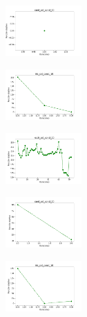 \begin{figure}[H]
\begin{subfigure}
    \end{subfigure}
    \hfill
    \begin{subfigure}
        \centering
        \includegraphics[width=0.32\textwidth]{img/copkm/rand_set_const_10_589741062_cost.png}
    \end{subfigure}
    \hfill
    \begin{subfigure}
        \centering
        \includegraphics[width=0.32\textwidth]{img/copkm/iris_set_const_10_277451237_cost.png}
    \end{subfigure}
    \hfill
    \begin{subfigure}
        \centering
        \includegraphics[width=0.32\textwidth]{img/copkm/ecoli_set_const_10_277451237_cost.png}
    \end{subfigure}
    \hfill
    \begin{subfigure}
        \centering
        \includegraphics[width=0.32\textwidth]{img/copkm/rand_set_const_10_277451237_cost.png}
    \end{subfigure}
    \hfill
    \begin{subfigure}
        \centering
        \includegraphics[width=0.32\textwidth]{img/copkm/iris_set_const_10_49258669_cost.png}

\end{subfigure}
\end{figure}
